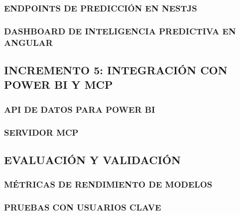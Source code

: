 \subsubsection{ENDPOINTS DE PREDICCIÓN EN NESTJS}
\subsubsection{DASHBOARD DE INTELIGENCIA PREDICTIVA EN ANGULAR}

\subsection{INCREMENTO 5: INTEGRACIÓN CON POWER BI Y MCP}
\subsubsection{API DE DATOS PARA POWER BI}
\subsubsection{SERVIDOR MCP}

\subsection{EVALUACIÓN Y VALIDACIÓN}
\subsubsection{MÉTRICAS DE RENDIMIENTO DE MODELOS}
\subsubsection{PRUEBAS CON USUARIOS CLAVE}
